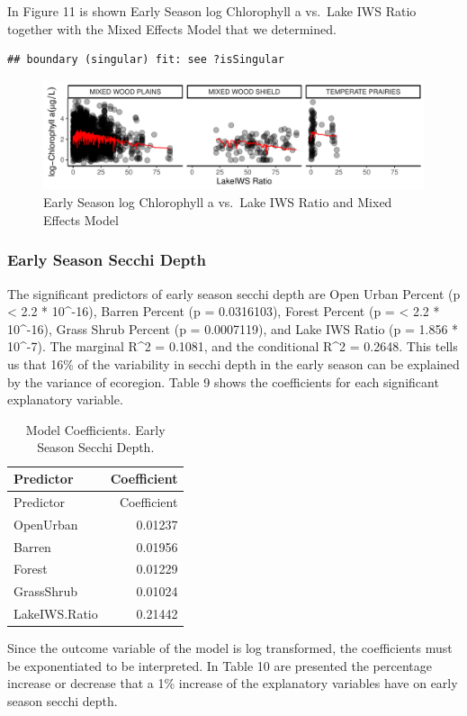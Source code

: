 \documentclass[12pt,]{article}
\begin{document}
In Figure 11 is shown Early Season log Chlorophyll a vs.~Lake IWS Ratio
together with the Mixed Effects Model that we determined.

\begin{verbatim}
## boundary (singular) fit: see ?isSingular
\end{verbatim}

\begin{figure}
\centering
\includegraphics{Bollt_Greif_Raby_Roth_Project_Final_files/figure-latex/unnamed-chunk-19-1.pdf}
\caption{Early Season log Chlorophyll a vs.~Lake IWS Ratio and Mixed
Effects Model}
\end{figure}

\hypertarget{early-season-secchi-depth}{%
\subsubsection{Early Season Secchi
Depth}\label{early-season-secchi-depth}}

The significant predictors of early season secchi depth are Open Urban
Percent (p \textless{} 2.2 * 10\^{}-16), Barren Percent (p = 0.0316103),
Forest Percent (p = \textless{} 2.2 * 10\^{}-16), Grass Shrub Percent (p
= 0.0007119), and Lake IWS Ratio (p = 1.856 * 10\^{}-7). The marginal
R\^{}2 = 0.1081, and the conditional R\^{}2 = 0.2648. This tells us that
16\% of the variability in secchi depth in the early season can be
explained by the variance of ecoregion. Table 9 shows the coefficients
for each significant explanatory variable.

\begin{longtable}[]{@{}lr@{}}
\caption{Model Coefficients. Early Season Secchi Depth.}\tabularnewline
\toprule
Predictor & Coefficient\tabularnewline
\midrule
\endfirsthead
\toprule
Predictor & Coefficient\tabularnewline
\midrule
\endhead
OpenUrban & 0.01237\tabularnewline
Barren & 0.01956\tabularnewline
Forest & 0.01229\tabularnewline
GrassShrub & 0.01024\tabularnewline
LakeIWS.Ratio & 0.21442\tabularnewline
\bottomrule
\end{longtable}

Since the outcome variable of the model is log transformed, the
coefficients must be exponentiated to be interpreted. In Table 10 are
presented the percentage increase or decrease that a 1\% increase of the
explanatory variables have on early season secchi depth.
\end{document}
